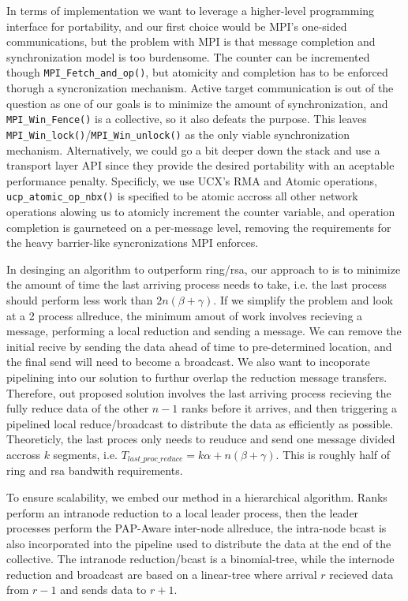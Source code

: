 In terms of implementation we want to leverage a higher-level programming interface for portability, and our first choice would be MPI's one-sided communications, but the problem with MPI is that message completion and synchronization model is too burdensome. 
The counter can be incremented though \texttt{MPI\_Fetch\_and\_op()}, but atomicity and completion has to be enforced thorugh a syncronization mechanism. 
Active target communication is out of the question as one of our goals is to minimize the amount of synchronization, and \texttt{MPI\_Win\_Fence()} is a collective, so it also defeats the purpose.
This leaves \texttt{MPI\_Win\_lock()}/\texttt{MPI\_Win\_unlock()} as the only viable synchronization mechanism.
Alternatively, we could go a bit deeper down the stack and use a transport layer API since they provide the desired portability with an aceptable performance penalty.
Specificly, we use UCX's RMA and Atomic operations, \texttt{ucp\_atomic\_op\_nbx()} is specified to be atomic accross all other network operations alowing us to atomicly increment the counter variable, and operation completion is gaurneteed on a per-message level, removing the requirements for the heavy barrier-like syncronizations MPI enforces.

In desinging an algorithm to outperform ring/rsa, our approach to is to minimize the amount of time the last arriving process needs to take, i.e. the last process should perform less work than $2n(\beta+\gamma)$. 
If we simplify the problem and look at a 2 process allreduce, the minimum amout of work involves recieving a message, performing a local reduction and sending a message.
We can remove the initial recive by sending the data ahead of time to pre-determined location, and the final send will need to become a broadcast. 
We also want to incoporate pipelining into our solution to furthur overlap the reduction message transfers.
Therefore, out proposed solution involves the last arriving process recieving the fully reduce data of the other $n-1$ ranks before it arrives, and then triggering a pipelined local reduce/broadcast to distribute the data as efficiently as possible. 
Theoreticly, the last proces only needs to reuduce and send one message divided accross $k$ segments, i.e. $T_{last\_proc\_reduce}=k\alpha+n(\beta+\gamma)$.
This is roughly half of ring and rsa bandwith requirements.

To ensure scalability, we embed our method in a hierarchical algorithm. 
Ranks perform an intranode reduction to a local leader process, then the leader processes perform the PAP-Aware inter-node allreduce, the intra-node bcast is also incorporated into the pipeline used to distribute the data at the end of the collective. 
The intranode reduction/bcast is a binomial-tree, while the internode reduction and broadcast are based on a linear-tree where arrival $r$ recieved data from $r-1$ and sends data to $r+1$.

